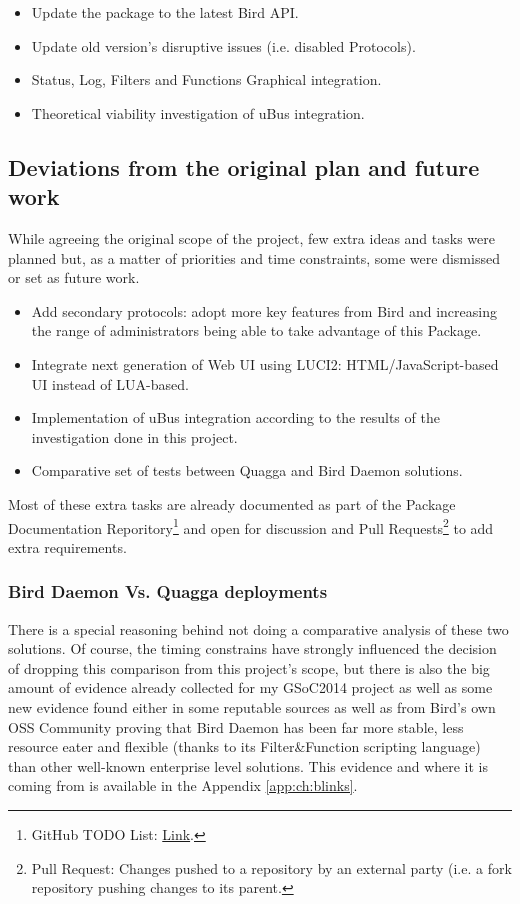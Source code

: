 \begin{itemize}
    \item Update the package to the latest Bird API.
    \item Update old version's disruptive issues (i.e. disabled Protocols).
    \item Status, Log, Filters and Functions Graphical integration.
    \item Theoretical viability investigation of uBus integration.
\end{itemize}


\subsection{Deviations from the original plan and future  work}
While agreeing the original scope of the project, few extra ideas and tasks were planned but, as a matter of priorities and time constraints, some were dismissed or set as future work.

\begin{itemize}
    \item Add secondary protocols: adopt more key features from Bird and increasing the range of administrators being able to take advantage of this Package.
    \item Integrate next generation of Web UI using LUCI2: HTML/JavaScript-based UI instead of LUA-based.
    \item Implementation of uBus integration according to the results of the investigation done in this project.
    \item Comparative set of tests between Quagga and Bird Daemon solutions.
\end{itemize}

Most of these extra tasks are already documented as part of the Package Documentation Reporitory\footnote{GitHub TODO List: \href{https://github.com/eloicaso/bgp-bmx6-bird-docn/blob/master/EN/TODO.md}{Link}.} and open for discussion and Pull Requests\footnote{Pull Request: Changes pushed to a repository by an external party (i.e. a fork repository pushing changes to its parent.} to add extra requirements.

\subsubsection{Bird Daemon Vs. Quagga deployments}
There is a special reasoning behind not doing a comparative analysis of these two solutions. Of course, the timing constrains have strongly influenced the decision of dropping this comparison from this project's scope, but there is also the big amount of evidence already collected for my GSoC2014 project as well as some new evidence found either in some reputable sources as well as from Bird's own OSS Community proving that Bird Daemon has been far more stable, less resource eater and flexible (thanks to its Filter\&Function scripting language) than other well-known enterprise level solutions. This evidence and where it is coming from is available in the Appendix \ref{app:ch:blinks}.


